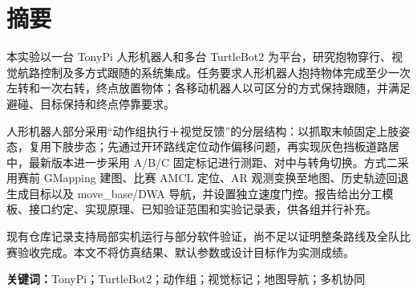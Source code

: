 \section*{摘要}
本实验以一台 TonyPi 人形机器人和多台 TurtleBot2 为平台，研究抱物穿行、视觉航路控制及多方式跟随的系统集成。任务要求人形机器人抱持物体完成至少一次左转和一次右转，终点放置物体；各移动机器人以可区分的方式保持跟随，并满足避碰、目标保持和终点停靠要求。

人形机器人部分采用“动作组执行＋视觉反馈”的分层结构：以抓取末帧固定上肢姿态，复用下肢步态；先通过开环路线定位动作偏移问题，再实现灰色挡板道路居中，最新版本进一步采用 A/B/C 固定标记进行测距、对中与转角切换。方式二采用赛前 GMapping 建图、比赛 AMCL 定位、AR 观测变换至地图、历史轨迹回退生成目标以及 move\_base/DWA 导航，并设置独立速度门控。报告给出分工模板、接口约定、实现原理、已知验证范围和实验记录表，供各组并行补充。

现有仓库记录支持局部实机运行与部分软件验证，尚不足以证明整条路线及全队比赛验收完成。本文不将仿真结果、默认参数或设计目标作为实测成绩。

\noindent\textbf{关键词：}TonyPi；TurtleBot2；动作组；视觉标记；地图导航；多机协同
